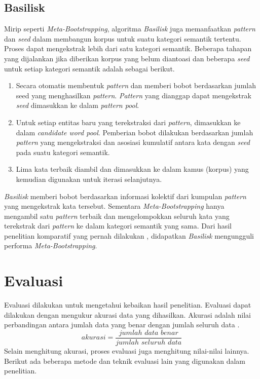 \subsection{Basilisk}
Mirip seperti \textit{Meta-Bootstrapping}, algoritma \textit{Basilisk} \citep{thelen2002bootstrapping} juga memanfaatkan \textit{pattern} dan \textit{seed} dalam membangun korpus untuk suatu kategori semantik tertentu. Proses dapat mengekstrak lebih dari satu kategori semantik. Beberapa tahapan yang dijalankan jika diberikan korpus yang belum diantoasi dan beberapa \textit{seed} untuk setiap kategori semantik adalah sebagai berikut.
\begin{enumerate}
  \item Secara otomatis membentuk \textit{pattern} dan memberi bobot berdasarkan jumlah seed yang menghasilkan \textit{pattern}. \textit{Pattern} yang dianggap dapat mengekstrak \textit{seed} dimasukkan ke dalam \textit{pattern pool}.
  \item Untuk setiap entitas baru yang terekstraksi dari \textit{pattern}, dimasukkan ke dalam \textit{candidate word pool}. Pemberian bobot dilakukan berdasarkan jumlah \textit{pattern} yang mengekstraksi dan asosiasi kumulatif antara kata dengan \textit{seed} pada suatu kategori semantik.
  \item Lima kata terbaik diambil dan dimasukkan ke dalam kamus (korpus) yang kemudian digunakan untuk iterasi selanjutnya. 
\end{enumerate}

\textit{Basilisk} memberi bobot berdasarkan informasi kolektif dari kumpulan \textit{pattern} yang mengekstrak kata tersebut. Sementara \textit{Meta-Bootstrapping} hanya mengambil satu \textit{pattern} terbaik dan mengelompokkan seluruh kata yang terekstrak dari \textit{pattern} ke dalam kategori semantik yang sama. Dari hasil penelitian komparatif yang pernah dilakukan \citep{riloff2003learning}, didapatkan \textit{Basilisk} mengungguli performa \textit{Meta-Bootstrapping}. 


\section{Evaluasi}
Evaluasi dilakukan untuk mengetahui kebaikan hasil penelitian. Evaluasi dapat dilakukan dengan mengukur akurasi data yang dihasilkan. Akurasi adalah nilai perbandingan antara jumlah data yang benar dengan jumlah seluruh data \citep{manning2008introduction}. 
\begin{equation}
akurasi=\frac{jumlah\,\,data\,\,benar}{jumlah\,\,seluruh\,\,data}
\end{equation}
Selain menghitung akurasi, proses evaluasi juga menghitung nilai-nilai lainnya. Berikut ada beberapa metode dan teknik evaluasi lain yang digunakan dalam penelitian.

